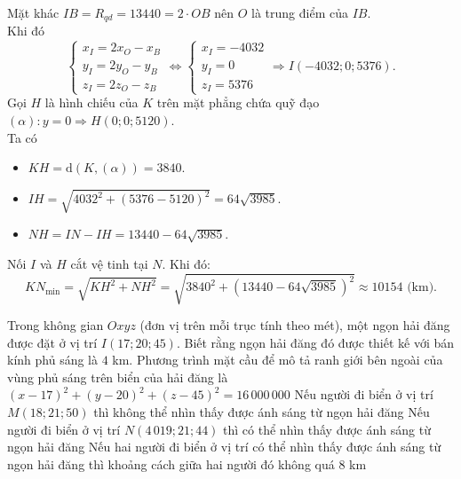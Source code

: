 \begin{ex}
{\begin{itemchoice}
Mặt khác $IB=R_{qd}=13440=2\cdot OB$ nên $O$ là trung điểm của $IB$.\\
Khi đó
\[\begin{cases}
x_I=2x_O-x_B \\
y_I=2y_O-y_B \\
z_I=2z_O-z_B
\end{cases}
\Leftrightarrow
\begin{cases}
x_I=-4032\\
y_I=0\\
z_I=5376\end{cases}
\Rightarrow I(-4032; 0; 5376).\]
\itemch
Gọi $H$ là hình chiếu của $K$ trên mặt phẳng chứa quỹ đạo $(\alpha)\colon y=0\Rightarrow H(0; 0; 5120)$.\\
Ta có
\begin{itemize}
\item $KH=\mathrm{d}(K, (\alpha))=3840$.
\item $IH=\sqrt{4032^2+(5376-5120)^2}=64\sqrt{3985}$.
\item $NH=IN-IH=13440-64\sqrt{3985}$.
\end{itemize}
Nối $I$ và $H$ cắt vệ tinh tại $N$. Khi đó:
\[KN_{\text{min}}=\sqrt{KH^2+NH^2}=\sqrt{3840^2+(13440-64\sqrt{3985})^2} \approx 10154 \text{ (km)}.\]

\end{itemchoice}
}
\end{ex}

\begin{ex}%
Trong không gian $Oxyz$ (đơn vị trên mỗi trục tính theo mét), một ngọn hải đăng được đặt ở vị trí $I(17;20;45)$. Biết rằng ngọn hải đăng đó được thiết kế với bán kính phủ sáng là $4$ km.
\choiceTF
{\True Phương trình mặt cầu để mô tả ranh giới bên ngoài của vùng phủ sáng trên biển của hải đăng là $(x-17)^2+(y-20)^2+(z-45)^2=16\,000\,000$}
{Nếu người đi biển ở vị trí $M(18;21;50)$ thì không thể nhìn thấy được ánh sáng từ ngọn hải đăng}
{Nếu người đi biển ở vị trí $N(4\,019;21;44)$ thì có thể nhìn thấy được ánh sáng từ ngọn hải đăng}
{\True Nếu hai người đi biển ở vị trí có thể nhìn thấy được ánh sáng từ ngọn hải đăng thì khoảng cách giữa hai người đó không quá $8$ km}
\end{ex}


